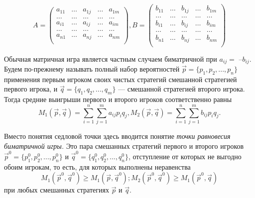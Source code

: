 \begin{equation}
\label{equation_4_44}
A=\begin{pmatrix}
a_{11} & \ldots & a_{1j} & \ldots & a_{1m} \\
\ldots & \ldots & \ldots & \ldots & \ldots \\
a_{i1} & \ldots & a_{ij} & \ldots & a_{im}\\
\ldots & \ldots & \ldots & \ldots & \ldots\\
a_{n1} & \ldots & a_{nj} & \ldots & a_{nm}\\
\end{pmatrix},
B=\begin{pmatrix}
b_{11} & \ldots & b_{1j} & \ldots & b_{1m} \\
\ldots & \ldots & \ldots & \ldots & \ldots \\
b_{i1} & \ldots & b_{ij} & \ldots & b_{im}\\
\ldots & \ldots & \ldots & \ldots & \ldots\\
b_{n1} & \ldots & b_{nj} & \ldots & b_{nm}\\
\end{pmatrix}
\end{equation}

Обычная матричная игра является частным случаем биматричной при $a_{ij}=$ –$b_{ij}.$ Будем по-прежнему называть полный набор вероятностей $\vec{p} =\{p_1, p_2, ... , p_n\}$ применения первым игроком своих чистых стратегий смешанной стратегией первого игрока, и $\vec{q}=\{q_1, q_2, ... , q_m\}$ — смешанной стратегией второго игрока. Тогда средние выигрыши первого и второго игроков соответственно равны
\begin{equation}
\label{equation_4_45}
   M_1(\vec{p}, \vec{q}) = \sum\limits_{i=1}^n \sum\limits_{j=1}^m a_{ij}p_iq_j,   M_2(\vec{p}, \vec{q}) = \sum\limits_{i=1}^n \sum\limits_{j=1}^mb_{ij}p_iq_j.
\end{equation}

Вместо понятия седловой точки здесь вводится понятие \emph{точки равновесия биматричной игры.} Это пара смешанных стратегий первого и второго игроков $\vec{p}^0 = \{ p_1^0, p_2^0,..., p_n^0\}$ и $\vec{q}^0 = \{ q_1^0, q_2^0,..., q_n^0\}$, отступление от которых не выгодно обоим игрокам, то есть, для которых выполнены неравенства
\begin{equation}
\label{equation_4_46}
   M_1(\vec{p}^0, \vec{q}^0) \geqslant M_1(\vec{p}, \vec{q}^0); M_2(\vec{p}^0, \vec{q}^0) \geqslant M_1(\vec{p}^0, \vec{q})
\end{equation}
при любых смешанных стратегиях $\vec{p}$ и $\vec{q}$.

